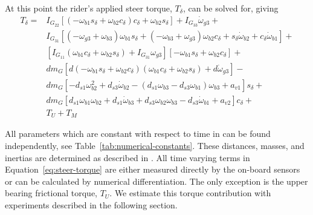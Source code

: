 \documentclass[10pt]{article}
\begin{document}
At this point the rider's applied steer torque, $T_\delta$, can be solved for,
giving
%
\begin{align}
  T_{\delta} =
    & I_{G_{22}} \left[ \left( -\omega_{b1} s_\delta + \omega_{b2} c_\delta \right)
      c_\delta + \omega_{b2} s_\delta \right] + I_{G_{33}} \dot{\omega}_{g3} + \nonumber \\
    & I_{G_{31}} \left[ (-\omega_{g3} + \omega_{b3} ) \omega_{b1} s_\delta +
      (-\omega_{b3} + \omega_{g3}) \omega_{b2} c_\delta +
      s_\delta \dot{\omega}_{b2} + c_\delta \dot{\omega}_{b1} \right] + \nonumber \\
    & \left[ I_{G_{11}} (\omega_{b1} c_\delta + \omega_{b2}s_\delta) +
      I_{G_{31}} \omega_{g3} \right] \left[-\omega_{b1} s_\delta +
      \omega_{b2} c_\delta \right] + \nonumber \\
    & d m_G \left[ d (-\omega_{b1} s_\delta + \omega_{b2} c_\delta)
      (\omega_{b1} c_\delta + \omega_{b2} s_\delta) + d \dot{\omega}_{g3} \right] - \nonumber \\
    & d m_G \left[-d_{s1} \omega_{b2}^{2} + d_{s3} \dot{\omega}_{b2} -
      (d_{s1} \omega_{b3} - d_{s3} \omega_{b1}) \omega_{b3} + a_{v1} \right] s_\delta + \nonumber \\
    & d m_G \left[d_{s1} \omega_{b1} \omega_{b2} + d_{s1} \dot{\omega}_{b3} +
      d_{s3} \omega_{b2} \omega_{b3} - d_{s3} \dot{\omega}_{b1} + a_{v2} \right]
      c_\delta + \nonumber \\
    & T_U + T_M
    \label{eq:steer-torque}
\end{align}

All parameters which are constant with respect to time in can be
found independently, see Table~\ref{tab:numerical-constants}.
These distances, masses, and inertias are determined as described in
\cite{Moore2012}. All time varying terms in Equation~\ref{eq:steer-torque} are
either measured directly by the on-board sensors or can be calculated by
numerical differentiation. The only exception is the upper bearing frictional
torque, $T_U$. We estimate this torque contribution with experiments
described in the following section.
\end{document}
